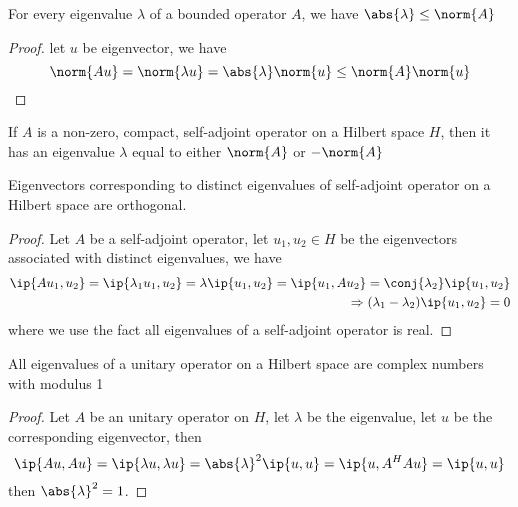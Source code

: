 \begin{refsection}
\begin{theorem}
\cite[183]{debnath2005hilbert} For every eigenvalue $\lambda$ of a bounded operator $A$, we have $\abs{\lambda} \leq \norm{A}$
\end{theorem}
\begin{proof}
let $u$ be eigenvector, we have
$$\norm{Au} = \norm{\lambda u} = \abs{\lambda}\norm{u} \leq \norm{A}\norm{u}$$	
\end{proof}


\begin{theorem}\cite[183]{debnath2005hilbert}
If $A$ is a non-zero, compact, self-adjoint operator on a Hilbert space $H$, then it has an eigenvalue $\lambda$ equal to either $\norm{A}$ or $-\norm{A}$
\end{theorem}






\begin{theorem}
\cite[182]{debnath2005hilbert} Eigenvectors corresponding to distinct eigenvalues of self-adjoint operator on a Hilbert space are orthogonal.
\end{theorem}
\begin{proof}
Let $A$ be a self-adjoint operator, let $u_1,u_2 \in H$ be the eigenvectors associated with distinct eigenvalues, we have
\begin{align*}
\ip{Au_1,u_2} = \ip{\lambda_1 u_1,u_2} = \lambda \ip{u_1,u_2} = \ip{u_1, Au_2}= \conj{\lambda_2} \ip{u_1,u_2}\\
\Rightarrow (\lambda_1 - \lambda_2)\ip{u_1,u_2} = 0 
\end{align*}
where we use the fact all eigenvalues of a self-adjoint operator is real.	
\end{proof}




\begin{theorem}
\cite[182]{debnath2005hilbert} All eigenvalues of a unitary operator on a Hilbert space are complex numbers with modulus 1
\end{theorem}
\begin{proof}
Let $A$ be an unitary operator on $H$, let $\lambda$ be the eigenvalue, let $u$ be the corresponding eigenvector, then
$$\ip{Au,Au} =\ip{\lambda u,\lambda u} = \abs{\lambda}^2 \ip{u,u}= \ip{u,A^HAu} = \ip{u,u}$$
then $\abs{\lambda}^2 =1$.	
\end{proof}




\end{refsection}
